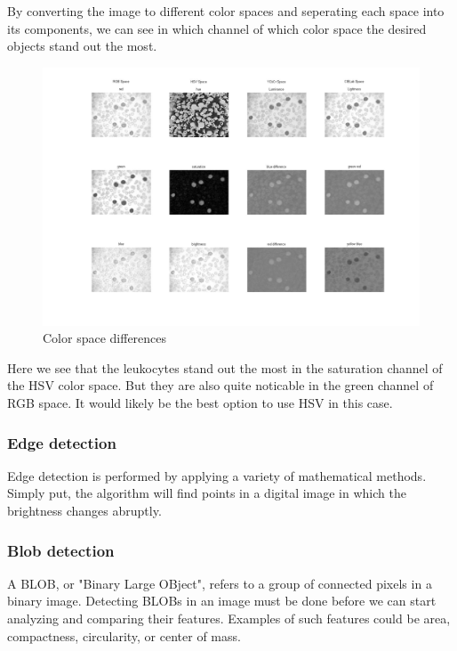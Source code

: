 			By converting the image to different color spaces and seperating each space into its components, we can see in which channel of which color space the desired objects stand out the most. 
			
					\begin{figure}[H]
				\centering
				\includegraphics[width=\linewidth]{figure/Analysis/differences.jpg}
				\caption{Color space differences}
				\label{fig:differences}
			\end{figure}
		Here we see that the leukocytes stand out the most in the saturation channel of the HSV color space. But they are also quite noticable in the green channel of RGB space. It would likely be the best option to use HSV in this case. 
		
			\subsubsection{Edge detection}
			
			Edge detection is performed by applying a variety of mathematical methods. Simply put, the algorithm will find points in a digital image in which the brightness changes abruptly. 
			
			\subsubsection{Blob detection}
			
			A BLOB, or "Binary Large OBject", refers to a group of connected pixels in a binary image. Detecting BLOBs in an image must be done before we can start analyzing and comparing their features. Examples of such features could be area, compactness, circularity, or center of mass.
			
